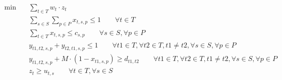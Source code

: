 \begin{align}
  \min\quad & \sum_{t \in T} w_{t} \cdot z_{t} \tag{passenger_inconvenience} \\
  & \sum_{s \in S} \sum_{p \in P} x_{t,s,p} \le 1 \qquad \forall t \in T \tag{train_assignment} \\
  & \sum_{t \in T} x_{t,s,p} \le c_{s,p} \qquad \forall s \in S, \forall p \in P \tag{platform_capacity} \\
  & y_{t1,t2,s,p} + y_{t2,t1,s,p} \le 1 \qquad \forall t1 \in T, \forall t2 \in T, t1 \neq t2, \forall s \in S, \forall p \in P \tag{train_ordering} \\
  & y_{t1,t2,s,p} + M \cdot (1 - x_{t1,s,p}) \ge d_{t1,t2} \qquad \forall t1 \in T, \forall t2 \in T, t1 \neq t2, \forall s \in S, \forall p \in P \tag{headway} \\
  & z_{t} \ge u_{t,s} \qquad \forall t \in T, \forall s \in S \tag{retiming} \\
\end{align}